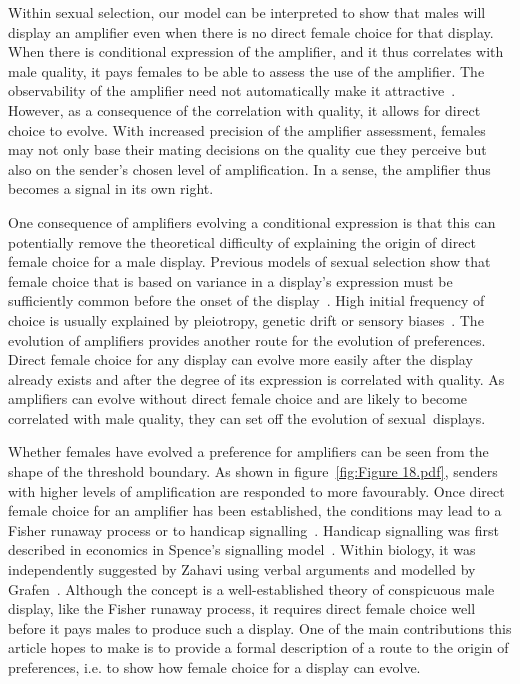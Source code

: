 \documentclass[a4paper,12pt]{article}
\numberwithin{equation}{section}
\numberwithin{figure}{section}
\begin{document}
Within sexual selection, our model can be interpreted to show that males will display an amplifier even when there is no direct female choice for that display. When there is conditional expression of the amplifier, and it thus correlates with male quality, it pays females to be able to assess the use of the amplifier. The observability of the amplifier need not automatically make it attractive~\cite{Gualla2008,Castellano2010}. However, as a consequence of the correlation with quality, it allows for direct choice to evolve. With increased precision of the amplifier assessment, females may not only base their mating decisions on the quality cue they perceive but also on the sender's chosen level of amplification. In a sense, the amplifier thus becomes a signal in its own right.

One consequence of amplifiers evolving a conditional expression is that this can potentially remove the theoretical difficulty of explaining the origin of direct female choice for a male display. Previous models of sexual selection show that female choice that is based on variance in a display's expression must be sufficiently common before the onset of the display~\cite{Kirkpatrick1982, Pomiankowski1987}. High initial frequency of choice is usually explained by pleiotropy, genetic drift or sensory biases~\cite{Kirkpatrick1982, Heisler1984, West-Eberhard1984, Kirkpatrick1987, Rodd2002}. The evolution of amplifiers provides another route for the evolution of preferences. Direct female choice for any display can evolve more easily after the display already exists and after the degree of its expression is correlated with quality. As amplifiers can evolve without direct female choice and are likely to become correlated with male quality, they can set off the evolution of sexual~displays.

Whether females have evolved a preference for amplifiers can be seen from the shape of the threshold boundary. As shown in figure~\ref{fig:Figure 18.pdf}, senders with higher levels of amplification are responded to more favourably. Once direct female choice for an amplifier has been established, the conditions may lead to a Fisher runaway process or to handicap signalling~\cite{Hasson1990}. Handicap signalling was first described in economics in Spence's signalling model~\cite{Spence1973}. Within biology, it was independently suggested by Zahavi using verbal arguments and modelled by Grafen~\cite{Zahavi1975, Zahavi1977, Grafen1990, Grafen1990a}. Although the concept is a well-established theory of conspicuous male display, like the Fisher runaway process, it requires direct female choice well before it pays males to produce such a display. One of the main contributions this article hopes to make is to provide a formal description of a route to the origin of preferences, i.e. to show how female choice for a display can evolve.
\end{document}
